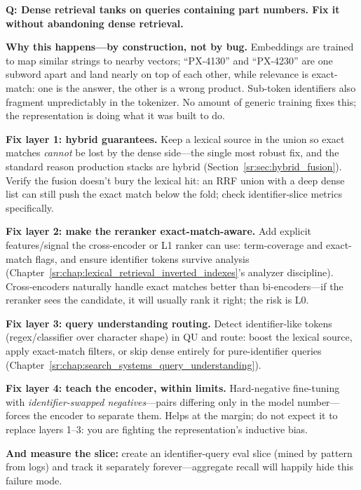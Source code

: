 \begin{interviewq}
\textbf{Q: Dense retrieval tanks on queries containing part numbers. Fix it without abandoning dense retrieval.}

 \quad {} \quad \badgefreq{\freqmed}

\stronganswer

\textbf{Why this happens---by construction, not by bug.} Embeddings are trained to map similar strings to nearby vectors; ``PX-4130'' and ``PX-4230'' are one subword apart and land nearly on top of each other, while relevance is exact-match: one is the answer, the other is a wrong product. Sub-token identifiers also fragment unpredictably in the tokenizer. No amount of generic training fixes this; the representation is doing what it was built to do.

\textbf{Fix layer 1: hybrid guarantees.} Keep a lexical source in the union so exact matches \textit{cannot} be lost by the dense side---the single most robust fix, and the standard reason production stacks are hybrid (Section~\ref{sr:sec:hybrid_fusion}). Verify the fusion doesn't bury the lexical hit: an RRF union with a deep dense list can still push the exact match below the fold; check identifier-slice metrics specifically.

\textbf{Fix layer 2: make the reranker exact-match-aware.} Add explicit features/signal the cross-encoder or L1 ranker can use: term-coverage and exact-match flags, and ensure identifier tokens survive analysis (Chapter~\ref{sr:chap:lexical_retrieval_inverted_indexes}'s analyzer discipline). Cross-encoders naturally handle exact matches better than bi-encoders---if the reranker sees the candidate, it will usually rank it right; the risk is L0.

\textbf{Fix layer 3: query understanding routing.} Detect identifier-like tokens (regex/classifier over character shape) in QU and route: boost the lexical source, apply exact-match filters, or skip dense entirely for pure-identifier queries (Chapter~\ref{sr:chap:search_systems_query_understanding}).

\textbf{Fix layer 4: teach the encoder, within limits.} Hard-negative fine-tuning with \textit{identifier-swapped negatives}---pairs differing only in the model number---forces the encoder to separate them. Helps at the margin; do not expect it to replace layers 1--3: you are fighting the representation's inductive bias.

\textbf{And measure the slice:} create an identifier-query eval slice (mined by pattern from logs) and track it separately forever---aggregate recall will happily hide this failure mode.


\end{interviewq}

